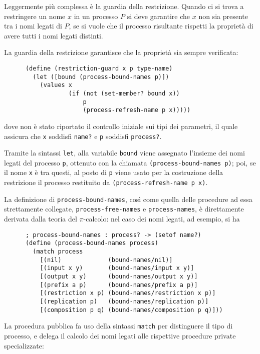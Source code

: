 Leggermente pi\`u complessa \`e la guardia della restrizione. Quando ci si
trova a restringere un nome $x$ in un processo $P$ si deve garantire che
$x$ non sia presente tra i nomi legati di $P$, se si vuole che il processo
risultante rispetti la propriet\`a di avere tutti i nomi legati distinti.

La guardia della restrizione garantisce che la propriet\`a sia sempre
verificata:

\begin{lstlisting}
      (define (restriction-guard x p type-name)
        (let ([bound (process-bound-names p)])
          (values x
                  (if (not (set-member? bound x))
                      p
                      (process-refresh-name p x)))))
\end{lstlisting}

dove non \`e stato riportato il controllo iniziale sui tipi dei parametri,
il quale assicura che \lstinline{x} soddisfi \lstinline{name?} e
\lstinline{p} soddisfi \lstinline{process?}.

Tramite la sintassi \lstinline{let}, alla variabile \lstinline{bound} viene
assegnato l'insieme dei nomi legati del processo \lstinline{p}, ottenuto
con la chiamata \lstinline{(process-bound-names p)}; poi, se il nome
\lstinline{x} \`e tra questi, al posto di \lstinline{p} viene usato per la
costruzione della restrizione il processo restituito da
\lstinline{(process-refresh-name p x)}.

La definizione di \lstinline{process-bound-names}, cos\`i come quella delle
procedure ad essa strettamente collegate, \lstinline{process-free-names} e
\lstinline{process-names}, \`e direttamente derivata dalla teoria del
$\pi$-calcolo: nel caso dei nomi legati, ad esempio, si ha

\begin{lstlisting}
      ; process-bound-names : process? -> (setof name?)
      (define (process-bound-names process)
        (match process
          [(nil)             (bound-names/nil)]
          [(input x y)       (bound-names/input x y)]
          [(output x y)      (bound-names/output x y)]
          [(prefix a p)      (bound-names/prefix a p)]
          [(restriction x p) (bound-names/restriction x p)]
          [(replication p)   (bound-names/replication p)]
          [(composition p q) (bound-names/composition p q)]))
\end{lstlisting}

La procedura pubblica fa uso della sintassi \lstinline{match} per distinguere
il tipo di processo, e delega il calcolo dei nomi legati alle rispettive
procedure private specializzate:

